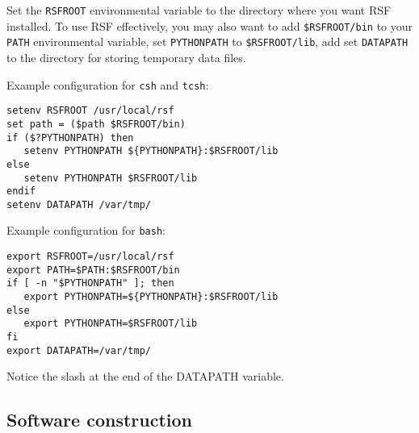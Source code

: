 Set the \texttt{RSFROOT} environmental variable to the directory where
you want RSF installed. To use RSF effectively, you may also want to add
\texttt{\$RSFROOT/bin} to your \texttt{PATH} environmental variable, set
\texttt{PYTHONPATH} to \texttt{\$RSFROOT/lib}, add set \texttt{DATAPATH} to
the directory for storing temporary data files. 

Example configuration for \texttt{csh} and \texttt{tcsh}:
\begin{verbatim}
setenv RSFROOT /usr/local/rsf
set path = ($path $RSFROOT/bin)
if ($?PYTHONPATH) then
   setenv PYTHONPATH ${PYTHONPATH}:$RSFROOT/lib
else
   setenv PYTHONPATH $RSFROOT/lib
endif
setenv DATAPATH /var/tmp/
\end{verbatim}

Example configuration for \texttt{bash}:
\begin{verbatim}
export RSFROOT=/usr/local/rsf
export PATH=$PATH:$RSFROOT/bin
if [ -n "$PYTHONPATH" ]; then
   export PYTHONPATH=${PYTHONPATH}:$RSFROOT/lib
else
   export PYTHONPATH=$RSFROOT/lib
fi
export DATAPATH=/var/tmp/
\end{verbatim}

Notice the slash at the end of the DATAPATH variable.

\subsection{Software construction}

